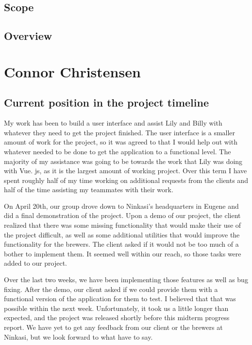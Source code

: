 \documentclass[draftclsnofoot,onecolumn,letterpaper,10pt,compsoc]{IEEEtran}
\begin{document}
\subsection{Scope}

\subsection{Overview}

\section{Connor Christensen}
\subsection{Current position in the project timeline}

My work has been to build a user interface and assist Lily and Billy with whatever they need to get the project finished.
The user interface is a smaller amount of work for the project, so it was agreed to that I would help out with whatever needed to be done to get the application to a functional level.
The majority of my assistance was going to be towards the work that Lily was doing with Vue.
js, as it is the largest amount of working project.
Over this term I have spent roughly half of my time working on additional requests from the clients and half of the time assisting my teammates with their work.


On April 20th, our group drove down to Ninkasi's headquarters in Eugene and did a final demonstration of the project.
Upon a demo of our project, the client realized that there was some missing functionality that would make their use of the project difficult, as well as some additional utilities that would improve the functionality for the brewers.
The client asked if it would not be too much of a bother to implement them.
It seemed well within our reach, so those tasks were added to our project.


Over the last two weeks, we have been implementing those features as well as bug fixing.
After the demo, our client asked if we could provide them with a functional version of the application for them to test.
I believed that that was possible within the next week.
Unfortunately, it took us a little longer than expected, and the project was released shortly before this midterm progress report.
We have yet to get any feedback from our client or the brewers at Ninkasi, but we look forward to what have to say.
\end{document}
